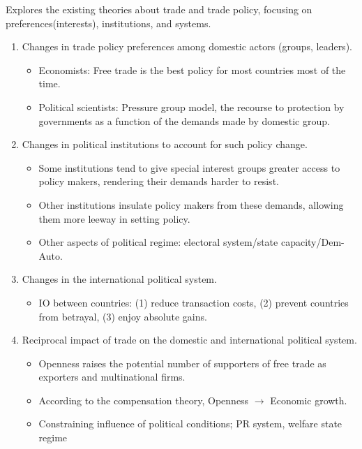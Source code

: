 \documentclass[
]{book}
\providecommand{\tightlist}{%
  \setlength{\itemsep}{0pt}\setlength{\parskip}{0pt}}
\begin{document}
Explores the existing theories about trade and trade policy, focusing on preferences(interests), institutions, and systems.

\begin{enumerate}
\def\labelenumi{\arabic{enumi}.}
\item
  Changes in trade policy preferences among domestic actors (groups, leaders).

  \begin{itemize}
  \item
    Economists: Free trade is the best policy for most countries most of the time.
  \item
    Political scientists: Pressure group model, the recourse to protection by governments as a function of the demands made by domestic group.
  \end{itemize}
\item
  Changes in political institutions to account for such policy change.

  \begin{itemize}
  \item
    Some institutions tend to give special interest groups greater access to policy makers, rendering their demands harder to resist.
  \item
    Other institutions insulate policy makers from these demands, allowing them more leeway in setting policy.
  \item
    Other aspects of political regime: electoral system/state capacity/Dem-Auto.
  \end{itemize}
\item
  Changes in the international political system.

  \begin{itemize}
  \tightlist
  \item
    IO between countries: (1) reduce transaction costs, (2) prevent countries from betrayal, (3) enjoy absolute gains.
  \end{itemize}
\item
  Reciprocal impact of trade on the domestic and international political system.

  \begin{itemize}
  \item
    Openness raises the potential number of supporters of free trade as exporters and multinational firms.
  \item
    According to the compensation theory, Openness \(\rightarrow\) Economic growth.
  \item
    Constraining influence of political conditions; PR system, welfare state regime
  \end{itemize}
\end{enumerate}
\end{document}

